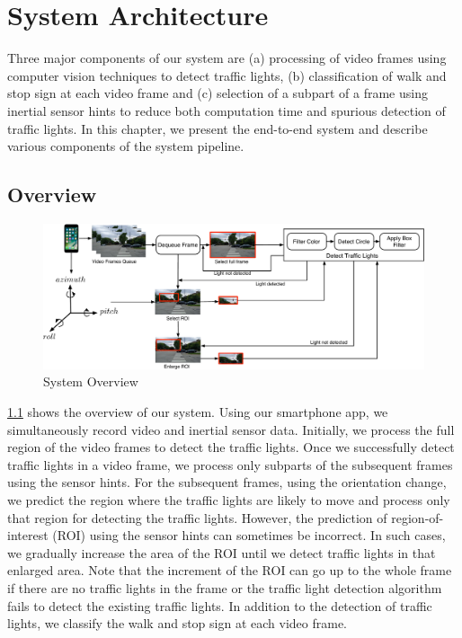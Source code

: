 \chapter{System Architecture}
\label{c:system}
Three major components of our system are (a) processing of video frames using computer vision techniques to detect traffic lights, (b) classification of walk and stop sign at each video frame and (c) selection of a subpart of a frame using inertial sensor hints to reduce both computation time and spurious detection of traffic lights. 
In this chapter, we present the end-to-end system and describe various components of the system pipeline.


\section{Overview}
\label{s:overview}

\begin{figure}
\centering
\includegraphics[width=6.2in]{figures/sysdia2.pdf}
\caption{System Overview}
\label{f:sys_dia}
\end{figure}

\ref{f:sys_dia} shows the overview of our system.
Using our smartphone app, we simultaneously record video and inertial sensor data.
Initially, we process the full region of the video frames to detect the traffic lights.
Once we successfully detect traffic lights in a video frame, we process only subparts of the subsequent frames using the sensor hints. 
For the subsequent frames, using the orientation change, we predict the region where the traffic lights are likely to move and process only that region for detecting the traffic lights.
However, the prediction of region-of-interest (ROI) using the sensor hints can sometimes be incorrect.
In such cases, we gradually increase the area of the ROI until we detect traffic lights in that enlarged area. 
Note that the increment of the ROI can go up to the whole frame if there are no traffic lights in the frame or the traffic light detection algorithm fails to detect the existing traffic lights. 
In addition to the detection of traffic lights, we classify the walk and stop sign at each video frame.

